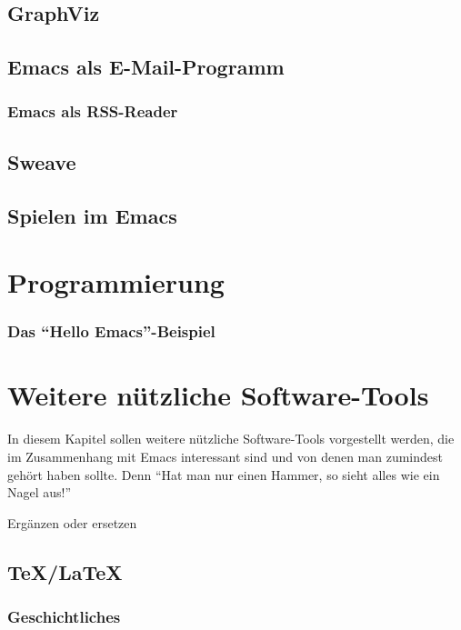 \documentclass[12pt,ngerman]{scrbook}
\begin{document}
\section{GraphViz}

\section{Emacs als E-Mail-Programm}

\subsection{Emacs als RSS-Reader}

\section{Sweave}

\section{Spielen im Emacs}

\chapter{Programmierung}

\subsection{Das \enquote{Hello Emacs}-Beispiel}




\chapter{Weitere nützliche Software-Tools}

In diesem Kapitel sollen weitere nützliche Software-Tools vorgestellt werden, die im Zusammenhang mit Emacs interessant sind und von denen man zumindest gehört haben sollte. Denn \enquote{Hat man nur einen Hammer, so sieht alles wie ein Nagel aus!}	

Ergänzen oder ersetzen

\section{\TeX/\LaTeX}

\subsection{Geschichtliches}
\end{document}
